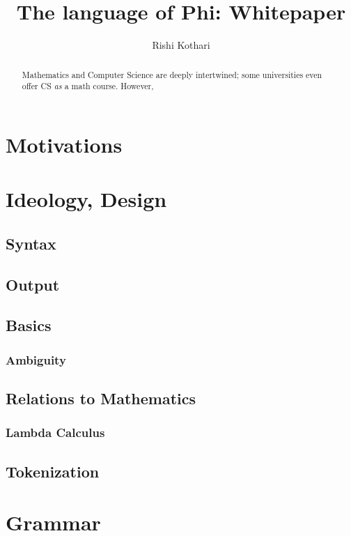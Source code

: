\documentclass[]{report}
\title{The language of Phi: Whitepaper}
\author{Rishi Kothari}
\date{}
\begin{document}
\maketitle

\newpage

\tableofcontents
\newpage
{}
\renewcommand{\abstractname}{Summary}
\begin{abstract}
	Mathematics and Computer Science are deeply intertwined; some universities even offer CS \textit{as} a math course. However, 
\end{abstract}

\chapter{Motivations}


\chapter[Design]{Ideology, Design}

\section{Syntax}


\section{Output}


\section{Basics}


\subsection{Ambiguity}


\section{Relations to Mathematics}

\subsection{Lambda Calculus}

\section{Tokenization}

\chapter{Grammar}
\end{document}
